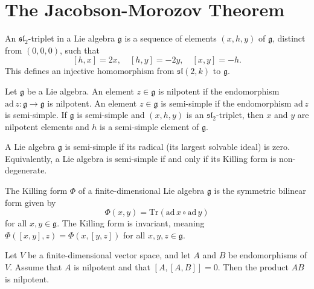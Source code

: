 \chapter{The Jacobson-Morozov Theorem}

\begin{definition}
    \label{def:sl2_triplet}
    An $\mathfrak{sl}_2$-triplet in a Lie algebra $\mathfrak{g}$ is a sequence of elements $(x, h, y)$ of $\mathfrak{g}$, distinct from $(0, 0, 0)$, such that
    $$[h, x] = 2x, \quad [h, y] = -2y, \quad [x, y] = -h.$$
    This defines an injective homomorphism from $\mathfrak{sl}(2, k)$ to $\mathfrak{g}$.
\end{definition}

\begin{definition}
    \label{def:nilpotent_and_semi_simple_elements}
    Let $\mathfrak{g}$ be a Lie algebra. An element $z \in \mathfrak{g}$ is nilpotent if the endomorphism $\mathrm{ad}\,z: \mathfrak{g} \to \mathfrak{g}$ is nilpotent. An element $z \in \mathfrak{g}$ is semi-simple if the endomorphism $\mathrm{ad}\,z$ is semi-simple. If $\mathfrak{g}$ is semi-simple and $(x, h, y)$ is an $\mathfrak{sl}_2$-triplet, then $x$ and $y$ are nilpotent elements and $h$ is a semi-simple element of $\mathfrak{g}$.
\end{definition}

\begin{definition}
    \label{def:semi_simple_lie_algebra}
    A Lie algebra $\mathfrak{g}$ is semi-simple if its radical (its largest solvable ideal) is zero. Equivalently, a Lie algebra is semi-simple if and only if its Killing form is non-degenerate.
\end{definition}

\begin{definition}
    \label{def:killing_form}
    The Killing form $\Phi$ of a finite-dimensional Lie algebra $\mathfrak{g}$ is the symmetric bilinear form given by
    $$\Phi(x, y) = \mathrm{Tr}(\mathrm{ad}\,x \circ \mathrm{ad}\,y)$$
    for all $x, y \in \mathfrak{g}$. The Killing form is invariant, meaning $\Phi([x, y], z) = \Phi(x, [y, z])$ for all $x, y, z \in \mathfrak{g}$.
\end{definition}

\begin{lemma}
    \label{lem:nilpotency_of_product}
    Let $V$ be a finite-dimensional vector space, and let $A$ and $B$ be endomorphisms of $V$. Assume that $A$ is nilpotent and that $[A, [A, B]] = 0$. Then the product $AB$ is nilpotent.
\end{lemma}

